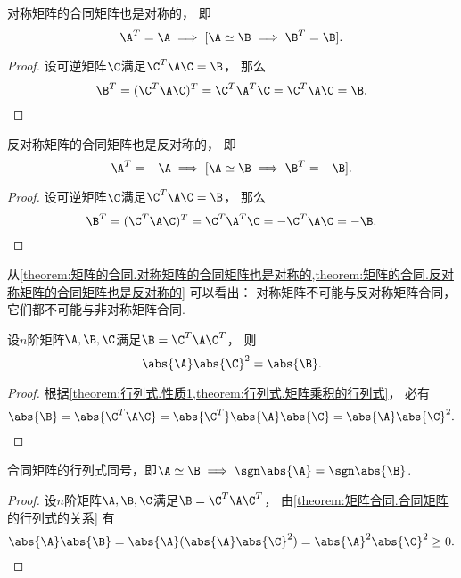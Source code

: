 \begin{proposition}\label{theorem:矩阵的合同.对称矩阵的合同矩阵也是对称的}
对称矩阵的合同矩阵也是对称的，
即\[
	\A^T = \A
	\implies
	[\A\simeq\B \implies \B^T = \B].
\]
\begin{proof}
设可逆矩阵\(\C\)满足\(\C^T\A\C=\B\)，
那么\[
	\B^T = (\C^T\A\C)^T = \C^T\A^T\C = \C^T\A\C = \B.
	\qedhere
\]
\end{proof}
\end{proposition}

\begin{proposition}\label{theorem:矩阵的合同.反对称矩阵的合同矩阵也是反对称的}
反对称矩阵的合同矩阵也是反对称的，
即\[
	\A^T = -\A
	\implies
	[\A\simeq\B \implies \B^T = -\B].
\]
\begin{proof}
设可逆矩阵\(\C\)满足\(\C^T\A\C=\B\)，
那么\[
	\B^T = (\C^T\A\C)^T = \C^T\A^T\C = -\C^T\A\C = -\B.
	\qedhere
\]
\end{proof}
\end{proposition}

\begin{remark}
从\cref{theorem:矩阵的合同.对称矩阵的合同矩阵也是对称的,theorem:矩阵的合同.反对称矩阵的合同矩阵也是反对称的}
可以看出：
对称矩阵不可能与反对称矩阵合同，
它们都不可能与非对称矩阵合同.
\end{remark}

\begin{proposition}\label{theorem:矩阵合同.合同矩阵的行列式的关系}
设\(n\)阶矩阵\(\A,\B,\C\)满足\(\B=\C^T\A\C^T\)，
则\[
	\abs{\A}\abs{\C}^2
	=\abs{\B}.
\]
\begin{proof}
根据\cref{theorem:行列式.性质1,theorem:行列式.矩阵乘积的行列式}，
必有\[
	\abs{\B}
	=\abs{\C^T\A\C}
	=\abs{\C^T}\abs{\A}\abs{\C}
	=\abs{\A}\abs{\C}^2.
	\qedhere
\]
\end{proof}
\end{proposition}

\begin{proposition}
合同矩阵的行列式同号，即\(\A\simeq\B\implies\sgn\abs{\A}=\sgn\abs{\B}\).
\begin{proof}
设\(n\)阶矩阵\(\A,\B,\C\)满足\(\B=\C^T\A\C^T\)，
由\cref{theorem:矩阵合同.合同矩阵的行列式的关系} 有\[
	\abs{\A}\abs{\B}
	=\abs{\A}(\abs{\A}\abs{\C}^2)
	=\abs{\A}^2\abs{\C}^2 \geq 0.
	\qedhere
\]
\end{proof}
\end{proposition}

